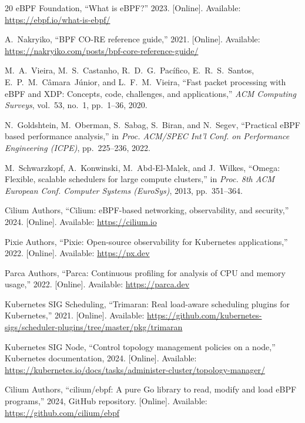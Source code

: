 \documentclass[10pt,conference,a4paper]{IEEEtran}
\begin{document}
\begin{thebibliography}{20}
eBPF Foundation,
``What is {eBPF}?'' 2023. [Online]. Available: \url{https://ebpf.io/what-is-ebpf/}


A.~Nakryiko,
``{BPF CO-RE} reference guide,'' 2021.
[Online]. Available: \url{https://nakryiko.com/posts/bpf-core-reference-guide/}


M.~A.~Vieira, M.~S.~Castanho, R.~D.~G.~Pac\'ifico, E.~R.~S.~Santos,
E.~P.~M.~C\^amara~J\'unior, and L.~F.~M.~Vieira,
``Fast packet processing with {eBPF} and {XDP}: Concepts, code, challenges,
and applications,''
\emph{ACM Computing Surveys}, vol.~53, no.~1, pp.~1--36, 2020.


N.~Goldshtein, M.~Oberman, S.~Sabag, S.~Biran, and N.~Segev,
``Practical {eBPF} based performance analysis,''
in \emph{Proc. ACM/SPEC Int'l Conf. on Performance Engineering (ICPE)},
pp.~225--236, 2022.


M.~Schwarzkopf, A.~Konwinski, M.~Abd-El-Malek, and J.~Wilkes,
``{Omega}: Flexible, scalable schedulers for large compute clusters,''
in \emph{Proc. 8th ACM European Conf. Computer Systems (EuroSys)}, 2013, pp.~351--364.


Cilium Authors,
``{Cilium}: {eBPF}-based networking, observability, and security,'' 2024.
[Online]. Available: \url{https://cilium.io}


Pixie Authors,
``{Pixie}: Open-source observability for {Kubernetes} applications,'' 2022.
[Online]. Available: \url{https://px.dev}


Parca Authors,
``{Parca}: Continuous profiling for analysis of {CPU} and memory usage,'' 2022.
[Online]. Available: \url{https://parca.dev}


Kubernetes SIG Scheduling,
``Trimaran: Real load-aware scheduling plugins for {Kubernetes},'' 2021.
[Online]. Available: \url{https://github.com/kubernetes-sigs/scheduler-plugins/tree/master/pkg/trimaran}


Kubernetes SIG Node,
``Control topology management policies on a node,'' Kubernetes documentation, 2024.
[Online]. Available: \url{https://kubernetes.io/docs/tasks/administer-cluster/topology-manager/}


Cilium Authors,
``cilium/ebpf: A pure {Go} library to read, modify and load {eBPF} programs,'' 2024, GitHub repository.
[Online]. Available: \url{https://github.com/cilium/ebpf}

\end{thebibliography}
\end{document}
